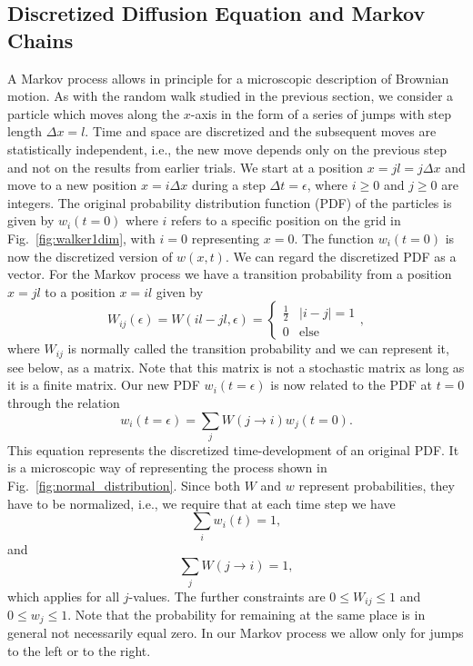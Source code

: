 \subsection{Discretized Diffusion Equation and Markov Chains}
A Markov process allows in principle for a microscopic description of Brownian motion.
As with the random walk studied in the previous section, we consider a particle 
which moves along the  $x$-axis in the form of a series of jumps with step length 
$\Delta x = l$. Time and space are discretized and the subsequent moves are
statistically independent, i.e., the new move depends only on the previous step
and not on the results from earlier trials. 
We start at a position $x=jl=j\Delta x$ and move to 
a new position $x =i\Delta x$ during a step $\Delta t=\epsilon$, where 
$i\ge  0$ and $j\ge 0$ are integers. 
The original probability distribution function (PDF) of the particles is given by  
$w_i(t=0)$ where $i$ refers to a specific position on the grid in 
Fig.~\ref{fig:walker1dim}, with $i=0$ representing $x=0$. 
The function $w_i(t=0)$ is now the discretized version of $w(x,t)$.
We can regard the discretized PDF as a vector.
For the Markov process we have a transition probability from a position
$x=jl$ to a position $x=il$ given by 
\[
   W_{ij}(\epsilon)=W(il-jl,\epsilon)=\left\{\begin{array}{cc}\frac{1}{2} & |i-j| = 1\\
             0 & \mathrm{else} \end{array} \right. ,
\]
where $W_{ij}$ is normally called 
the transition probability and we can represent it, see below,
as a matrix. Note that this matrix is not a stochastic matrix as long as it is a finite matrix.
Our new PDF $w_i(t=\epsilon)$ is now related to the PDF at
$t=0$ through the relation 
\[ 
   w_i(t=\epsilon) =\sum_{j} W(j\rightarrow i)w_j(t=0).
\]   
This equation represents the discretized time-development of an original 
PDF. It is a microscopic way of representing the process shown in
Fig.~\ref{fig:normal_distribution}.
Since both $W$ and $w$ represent probabilities, they have to be normalized, i.e., we require
that at each time step we have 
\[ 
   \sum_i w_i(t) = 1, 
\]
and 
\[ 
   \sum_j W(j\rightarrow i) = 1,
\]
which applies for all $j$-values.
The further constraints are
$0 \le W_{ij} \le 1$  and  $0 \le w_{j} \le 1$.
Note that the probability for remaining at the same place is in general 
not necessarily equal zero. In our Markov process we allow only for jumps to the left or to 
the right.

